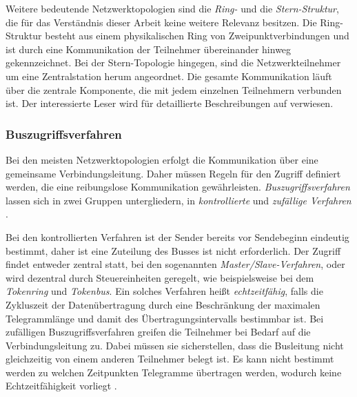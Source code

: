 Weitere bedeutende Netzwerktopologien sind die \textit{Ring-} und die \textit{Stern-Struktur}, die für das Verständnis dieser Arbeit keine weitere Relevanz besitzen.
Die Ring-Struktur besteht aus einem physikalischen Ring von Zweipunktverbindungen und ist durch eine Kommunikation der Teilnehmer übereinander hinweg gekennzeichnet.
Bei der Stern-Topologie hingegen, sind die Netzwerkteilnehmer um eine Zentralstation herum angeordnet. Die gesamte Kommunikation läuft über die zentrale Komponente, die mit jedem einzelnen Teilnehmern verbunden ist. Der interessierte Leser wird für detaillierte Beschreibungen auf \cite{schn06} verwiesen.

\subsubsection{Buszugriffsverfahren}

Bei den meisten Netzwerktopologien erfolgt die Kommunikation  über eine gemeinsame Verbindungsleitung. Daher müssen Regeln für den Zugriff definiert werden, die eine reibungslose Kommunikation gewährleisten. \textit{Buszugriffsverfahren} lassen sich in zwei Gruppen untergliedern, in \textit{kontrollierte} und \textit{zufällige Verfahren} \cite[S.~19]{schn06}.

Bei den kontrollierten Verfahren ist der Sender bereits vor Sendebeginn eindeutig bestimmt, daher ist eine Zuteilung des Busses ist nicht erforderlich. Der Zugriff findet entweder zentral statt, bei den sogenannten \textit{Master/Slave-Verfahren}, oder wird dezentral durch Steuereinheiten geregelt, wie beispielsweise bei dem \textit{Tokenring} und \textit{Tokenbus}. Ein solches Verfahren heißt \textit{echtzeitfähig}, falls die Zykluszeit der Datenübertragung durch eine Beschränkung der maximalen Telegrammlänge und damit des Übertragungsintervalls bestimmbar ist.
Bei zufälligen Buszugriffsverfahren greifen die Teilnehmer bei Bedarf auf die Verbindungsleitung zu. Dabei müssen sie sicherstellen, dass die Busleitung nicht gleichzeitig von einem anderen Teilnehmer belegt ist. Es kann nicht bestimmt werden zu welchen Zeitpunkten Telegramme übertragen werden, wodurch keine Echtzeitfähigkeit vorliegt \cite[S.~19]{schn06}.


